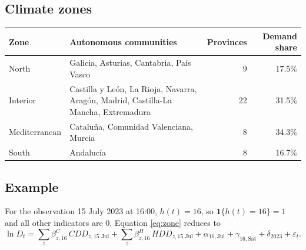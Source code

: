 \documentclass[11pt]{article}
\begin{document}
\subsection*{Climate zones}
\begin{center}
\begin{tabular}{@{}l >{\raggedright\arraybackslash}p{8.5cm} r r@{}}
\toprule
Zone & Autonomous communities & Provinces & Demand share \\
\midrule
North         & Galicia, Asturias, Cantabria, Pa\'is Vasco & 9 & 17.5\% \\
Interior      & Castilla y Le\'on, La Rioja, Navarra, Arag\'on, Madrid,
                Castilla-La Mancha, Extremadura & 22 & 31.5\% \\
Mediterranean & Catalu\~na, Comunidad Valenciana, Murcia & 8 & 34.3\% \\
South         & Andaluc\'ia & 8 & 16.7\% \\
\bottomrule
\end{tabular}
\end{center}

\subsection*{Example}
For the observation 15 July 2023 at 16:00, $h(t)=16$, so
$\mathbf{1}\{h(t)=16\}=1$ and all other indicators are 0. Equation
\eqref{eq:zone} reduces to
\[
\ln D_t = \sum_{z} \beta^{C}_{z,16}\, CDD_{z,\text{15 Jul}}
        + \sum_{z} \beta^{H}_{z,16}\, HDD_{z,\text{15 Jul}}
        + \alpha_{16,\text{Jul}} + \gamma_{16,\text{Sat}} + \delta_{2023} + \varepsilon_t .
\]
\end{document}

